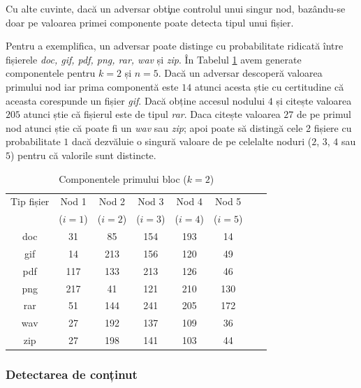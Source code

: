 \documentclass[oneside, 12pt]{book}
\begin{document}
Cu alte cuvinte, dacă un adversar obt\c{i}ne controlul unui singur nod, bazându-se doar pe valoarea primei componente poate detecta tipul unui fișier.

Pentru a exemplifica, un adversar poate distinge cu probabilitate ridicată între fișierele \textit{doc, gif, pdf, png, rar, wav} și \textit{zip}. În Tabelul {\ref{table:shares}} avem generate componentele pentru $k = 2$ și $n = 5$.
Dacă un adversar descoperă valoarea primului nod iar prima componentă este $14$ atunci acesta știe cu certitudine că aceasta corespunde un fișier \textit{gif}. Dacă obține accesul nodului $4$ și citește valoarea $205$ atunci știe că fișierul este de tipul \textit{rar}. Daca citește valoarea $27$ de pe primul nod atunci știe că poate fi un \textit{wav} sau \textit{zip}; apoi poate să distingă cele 2 fișiere cu probabilitate $1$ dacă dezvăluie o singură valoare de pe celelalte noduri ($2$, $3$, $4$ sau $5$) pentru că valorile sunt distincte.


\begin{table}[t]
\begin{center}
\caption{Componentele primului bloc ($k=2$)}\label{tb:margins}
\label{table:shares}
\begin{tabular}{cccccccc}
Tip fișier & Nod 1 & Nod 2 & Nod 3 & Nod 4 & Nod 5 \\
  & ($i=1$) & ($i=2$) & ($i=3$) & ($i=4$) & ($i=5$) \\
\hline
doc & 31 & 85 & 154 & 193 & 14 \\
gif & 14 & 213 & 156 & 120 & 49 \\
pdf & 117 & 133 & 213 & 126 & 46 \\
png & 217 & 41 & 121 & 210 & 130 \\ 
rar & 51 & 144 & 241 & 205 & 172  \\
wav & 27 & 192 & 137 & 109 & 36 \\
zip & 27 & 198 & 141 & 103 & 44 \\ \hline
\end{tabular}
\end{center}
\bigskip
\end{table}




\subsubsection{Detectarea de conținut}\hspace*{\fill} \\
\label{subsec:file_content_detection}
\end{document}

